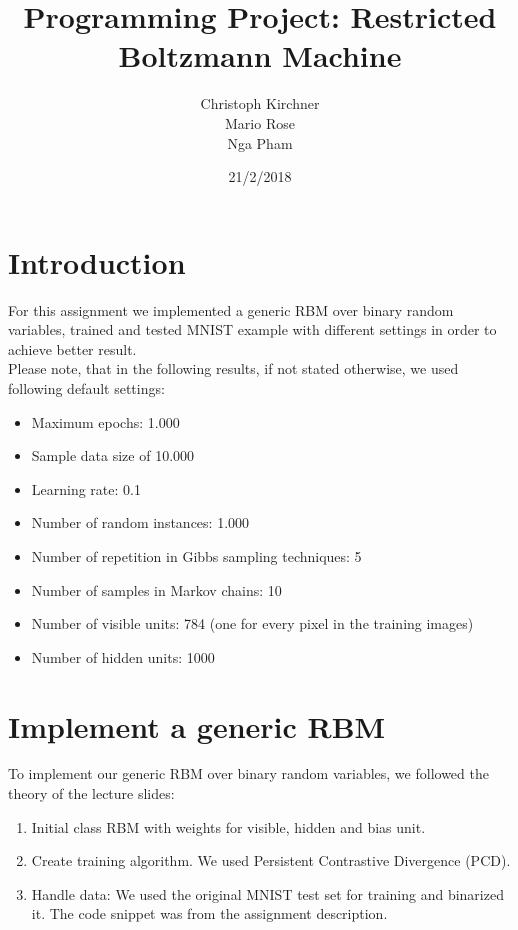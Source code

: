 \documentclass[a4paper]{article}
\title{Programming Project: Restricted Boltzmann Machine}
\author{Christoph Kirchner\\Mario Rose\\Nga Pham}
\date{21/2/2018}
\begin{document}
\maketitle
\section{Introduction}
For this assignment we implemented a generic RBM over binary random variables, trained and tested MNIST example with different settings in order to achieve better result.\\
Please note, that in the following results, if not stated otherwise, we used following default settings:
\begin{itemize}
    \item Maximum epochs: 1.000
    \item Sample data size of 10.000
    \item Learning rate: 0.1
    \item Number of random instances: 1.000
    \item Number of repetition in Gibbs sampling techniques: 5
    \item Number of samples in Markov chains: 10
    \item Number of visible units: 784 (one for every pixel in the training images)
    \item Number of hidden units: 1000
\end{itemize}


\section{Implement a generic RBM}
To implement our generic RBM over binary random variables, we followed the theory of the lecture slides:
\begin{enumerate}
    \item Initial class RBM with weights for visible, hidden and bias unit.
    \item Create training algorithm. We used Persistent Contrastive Divergence (PCD).
    \item Handle data: We used the original MNIST test set for training and binarized it. The code snippet was from the assignment description.
\end{enumerate}
\newpage
\end{document}
